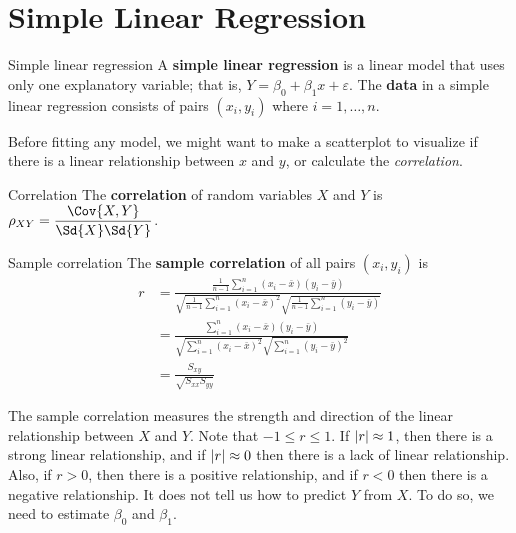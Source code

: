 \section{Simple Linear Regression}
\begin{Definition}{Simple linear regression}{}
    A \textbf{simple linear regression}
    is a linear model that uses only one
    explanatory variable; that is,
    $ Y=\beta_0+\beta_1x+\varepsilon $.
    The \textbf{data}
    in a simple linear regression consists of pairs $ (x_i,y_i) $
    where $ i=1,\ldots,n $.
\end{Definition}
\begin{Remark}{}{}
    Before fitting any model, we might want
    to make a scatterplot to visualize if there
    is a linear relationship between $ x $ and $ y $,
    or calculate the \emph{correlation}.
\end{Remark}
\begin{Definition}{Correlation}{}
    The \textbf{correlation} of
    random variables $ X $ and $ Y $ is
    $ \rho_{XY}=\dfrac{\Cov{X,Y}}{\Sd{X}\Sd{Y}} $.
\end{Definition}
\begin{Definition}{Sample correlation}{}
    The \textbf{sample correlation} of
    all pairs $ (x_i,y_i) $ is
    \begin{align*}
        r
         & =\frac{\frac{1}{n-1} \sum_{i=1}^{n}(x_i-\bar{x})(y_i-\bar{y})}
        {\sqrt{\frac{1}{n-1}\sum_{i=1}^{n} (x_i-\bar{x})^2}
        \sqrt{\frac{1}{n-1}\sum_{i=1}^{n}(y_i-\bar{y})}}                  \\
         & =\frac{\sum_{i=1}^{n} (x_i-\bar{x})(y_i-\bar{y})}{
            \sqrt{\sum_{i=1}^{n} (x_i-\bar{x})^2}
            \sqrt{\sum_{i=1}^{n} (y_i-\bar{y})^2}
        }                                                                 \\
         & =\frac{S_{xy}}{\sqrt{S_{xx}S_{yy}}}
    \end{align*}
\end{Definition}
\begin{Remark}{}{}
    The sample correlation measures the strength and direction of
    the linear relationship between $ X $ and $ Y $. Note
    that $ -1\leqslant r\leqslant 1 $.
    If $ \lvert r\rvert\approx 1 $, then
    there is a strong linear relationship, and if
    $ \lvert r\rvert\approx 0 $
    then there is a lack of linear relationship. Also, if $ r>0 $,
    then there is a positive relationship, and if $ r<0 $
    then there is a negative relationship.
    It does not tell us how to predict $ Y $ from $ X $. To do so,
    we need to estimate $ \beta_0 $ and $ \beta_1 $.
\end{Remark}

